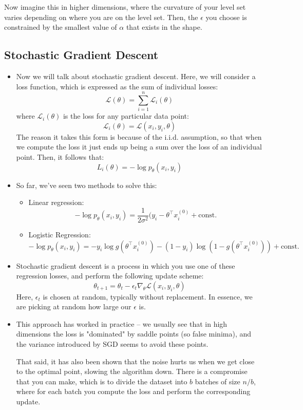 \begin{itemize}
		Now imagine this in higher dimensions, where the curvature of your level set
		varies depending on where you are on the level set. Then, the \( \epsilon \)
		you choose is constrained by the smallest value of \( \alpha \) that exists
		in the shape.  
\end{itemize}
\subsection{Stochastic Gradient Descent}
\begin{itemize}
	\item Now we will talk about stochastic gradient descent. Here, we will consider
		a loss function, which is expressed as the sum of individual losses:
		\[
			\mathcal{L}(\theta) = \sum_{i = 1}^{n} \mathcal{L}_i(\theta)
		\]
		where \( \mathcal{L}_i(\theta) \) is the loss for any particular data point:
		\[
			\mathcal{L}_i(\theta) = \mathcal{L}(x_i, y_i, \theta)
		\]
		The reason it takes this form is because of the i.i.d. assumption, so that
		when we compute the loss it just ends up being a sum over the loss of an
		individual point. Then, it follows that:
		\[
			L_{i}(\theta) = - \log p_{\theta}(x_i, y_i)
		\]
	\item So far, we've seen two methods to solve this:
		\begin{itemize}
			\item Linear regression:
				\[
					-\log p_{\theta}(x_i, y_i) = \frac{1}{2 \sigma^2} (y_i -
					\theta^{\top} x_i^{(0)} + \text{const.}
				\]

			\item Logistic Regression:
				\[
					-\log p_{\theta}(x_i, y_i) = -y_i \log g(\theta^{\top} x_i^{(0)})
					- (1 - y_i) \log(1 - g(\theta^{\top} x_i^{(0)})) + \text{const.}
				\]
		\end{itemize}
	\item Stochastic gradient descent is a process in which you use one of these
		regression losses, and perform the following update scheme:
		\[
			\theta_{t + 1} = \theta_t - \epsilon_t \nabla_{\theta}\mathcal{L}(x_i,
			y_i, \theta)
		\]
		Here, \( \epsilon_t \) is chosen at random, typically without replacement.
		In essence, we are picking at random how large our \( \epsilon \) is.  
	\item This approach has worked in practice -- we usually see that in high
		dimensions the loss is "dominated" by saddle points (so false minima), and
		the variance introduced by SGD seems to avoid these points. 

		That said, it has also been shown that the noise hurts us when we get close
		to the optimal point, slowing the algorithm down. There is a compromise that
		you can make, which is to divide the dataset into \( b \) batches of size \(
		n / b\), where for each batch you compute the loss and perform the
		corresponding update.  
\end{itemize}
